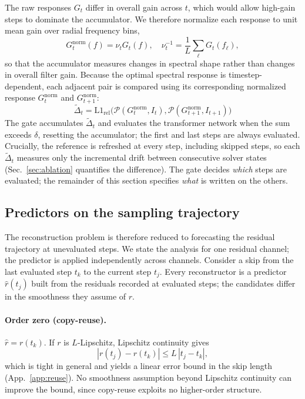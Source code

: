 \documentclass{article} %
\begin{document}
The raw responses $G_t$ differ in overall gain across $t$, which would
allow high-gain steps to dominate the accumulator. We therefore
normalize each response to unit mean gain over radial frequency bins,
\begin{equation}
  G_t^{\mathrm{norm}}(f) = \nu_t G_t(f), \quad
  \nu_t^{-1} = \frac{1}{L}\sum_{\ell} G_t(f_\ell),
  \label{eq:norm}
\end{equation}
so that the accumulator measures changes in spectral shape rather than
changes in overall filter gain. Because the optimal spectral response
is timestep-dependent, each adjacent pair is compared using its
corresponding normalized response $G_t^{\mathrm{norm}}$ and
$G_{t+1}^{\mathrm{norm}}$:
\begin{equation}
  \tilde{\Delta}_t = \mathrm{L1}_{\mathrm{rel}}\big(
  \mathcal{P}(G_t^{\mathrm{norm}}, I_t),
  \mathcal{P}(G_{t+1}^{\mathrm{norm}}, I_{t+1})\big)
  \label{eq:gate}
\end{equation}
The gate accumulates $\tilde{\Delta}_t$ and evaluates the transformer
network when the sum exceeds $\delta$, resetting the accumulator; the
first and last steps are always evaluated. Crucially, the reference is
refreshed at every step, including skipped steps, so each
$\tilde{\Delta}_t$ measures only the incremental drift between
consecutive solver states (Sec.~\ref{sec:ablation} quantifies the
difference). The gate decides \emph{which} steps are evaluated; the
remainder of this section specifies \emph{what} is written on the
others.

\subsection{Predictors on the sampling trajectory}
\label{sec:hierarchy}

The reconstruction problem is therefore reduced to forecasting the
residual trajectory at unevaluated steps. We state the analysis for one
residual channel; the predictor is applied independently across
channels. Consider a skip from the last evaluated step $t_k$ to the
current step $t_j$. Every reconstructor is a predictor
$\hat{r}(t_j)$ built from the residuals recorded at evaluated steps;
the candidates differ in the smoothness they assume of $r$.

\paragraph{Order zero (copy-reuse).}
$\hat{r} = r(t_k)$. If $r$ is $L$-Lipschitz, Lipschitz continuity gives
\begin{equation}
  |r(t_j) - r(t_k)| \le L\,|t_j - t_k|,
  \label{eq:reuse}
\end{equation}
which is tight in general and yields a linear error bound in the skip
length (App.~\ref{app:reuse}). No smoothness assumption beyond Lipschitz
continuity can improve the bound, since copy-reuse exploits no
higher-order structure.
\end{document}
